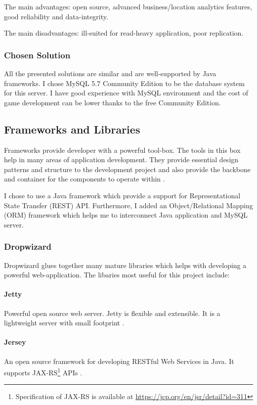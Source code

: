 		The main advantages: open source, advanced business/location analytics features, good reliability and data-integrity.
		
		The main disadvantages: ill-suited for read-heavy application, poor replication.
				
		\subsubsection{Chosen Solution}
		All the presented solutions are similar and are well-supported by Java frameworks. I chose MySQL 5.7 Community Edition to be the database system for this server. I have good experience with MySQL environment and the cost of game development can be lower thanks to the free Community Edition. 
		
	\subsection{Frameworks and Libraries}
	Frameworks provide developer with a powerful tool-box. The tools in this box help in many areas of application development. They provide essential design patterns and structure to the development project and also provide the backbone and container for the components to operate within \cite{frameworks}.
	
	I chose to use a Java framework which provide a support for Representational State Transfer (REST) API. Furthermore, I added an Object/Relational Mapping (ORM) framework which helps me to interconnect Java application and MySQL server.
	
		\subsubsection{Dropwizard}
		Dropwizard \cite{dropwizard} glues together many mature libraries which helps with developing a powerful web-application. The libaries most useful for this project include:
			\paragraph*{Jetty}
				Powerful open source web server. Jetty is flexible and extensible. It is a lightweight server with small footprint \cite{jetty}.
			\paragraph*{Jersey} 
				An open source framework for developing RESTful Web Services in Java. It supports JAX-RS\footnote{Specification of JAX-RS is available at \url{https://jcp.org/en/jsr/detail?id=311}} APIs \cite{jersey}.
